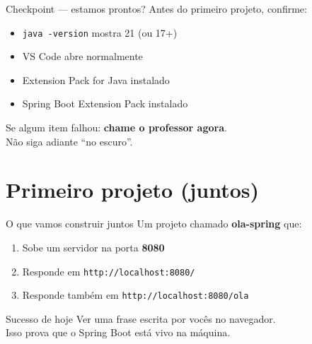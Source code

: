 \documentclass[aspectratio=169,11pt]{beamer}
\begin{document}
\begin{frame}{Checkpoint --- estamos prontos?}
  Antes do primeiro projeto, confirme:

  \vspace{0.5em}
  \begin{itemize}
    \item [ ] \texttt{java -version} mostra 21 (ou 17+)
    \item [ ] VS Code abre normalmente
    \item [ ] Extension Pack for Java instalado
    \item [ ] Spring Boot Extension Pack instalado
  \end{itemize}

  \vspace{0.8em}
  Se algum item falhou: \textbf{chame o professor agora}.\\
  Não siga adiante “no escuro”.
\end{frame}

\section{Primeiro projeto (juntos)}

\begin{frame}{O que vamos construir juntos}
  Um projeto chamado \textbf{ola-spring} que:

  \vspace{0.5em}
  \begin{enumerate}
    \item Sobe um servidor na porta \textbf{8080}
    \item Responde em \texttt{http://localhost:8080/}
    \item Responde também em \texttt{http://localhost:8080/ola}
  \end{enumerate}

  \vspace{0.8em}
  \begin{block}{Sucesso de hoje}
    Ver uma frase escrita por vocês no navegador.\\
    Isso prova que o Spring Boot está vivo na máquina.
  \end{block}
\end{frame}
\end{document}
